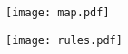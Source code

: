 \documentclass[parskip]{scrartcl}
\begin{document}
\begin{center}
  \texttt{[image: map.pdf]}
\end{center}

\texttt{[image: rules.pdf]}
\end{document}
